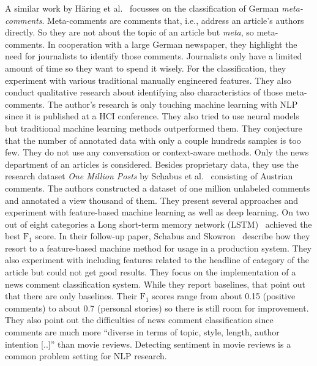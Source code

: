 A similar work by H\"aring et al.~\cite{haring2018addressed} focusses on the classification of German \textit{meta-comments}. Meta-comments are comments that, i.e., address an article's authors directly. So they are not about the topic of an article but \textit{meta}, so meta-comments. In cooperation with a large German newspaper, they highlight the need for journalists to identify those comments. Journalists only have a limited amount of time so they want to spend it wisely. For the classification, they experiment with various traditional manually engineered features. They also conduct qualitative research about identifying also characteristics of those meta-comments. The author's research is only touching machine learning with NLP since it is published at a HCI conference. They also tried to use neural models but traditional machine learning methods outperformed them. They conjecture that the number of annotated data with only a couple hundreds samples is too few. They do not use any conversation or context-aware methods. Only the news department of an articles is considered. Besides proprietary data, they use the research dataset \textit{One Million Posts} by Schabus et al.~\cite{Schabus:2017:OMP:3077136.3080711} consisting of Austrian comments. The authors constructed a dataset of one million unlabeled comments and annotated a view thousand of them. They present several approaches and experiment with feature-based machine learning as well as deep learning. On two out of eight categories a Long short-term memory network (LSTM)~\cite{Hochreiter:1997:LSM:1246443.1246450} achieved the best $\text{F}_{1}$ score. In their follow-up paper, Schabus and Skowron~\cite{schabus_academic-industrial_nodate} describe how they resort to a feature-based machine method for usage in a production system. They also experiment with including features related to the headline of category of the article but could not get good results. They focus on the implementation of a news comment classification system. While they report baselines, that point out that there are only baselines. Their $\text{F}_{1}$ scores range from about 0.15 (positive comments) to about 0.7 (personal stories) so there is still room for improvement. They also point out the difficulties of news comment classification since comments are much more ``diverse in terms of topic, style, length, author intention [..]'' than movie reviews. Detecting sentiment in movie reviews is a common problem setting for NLP research.

